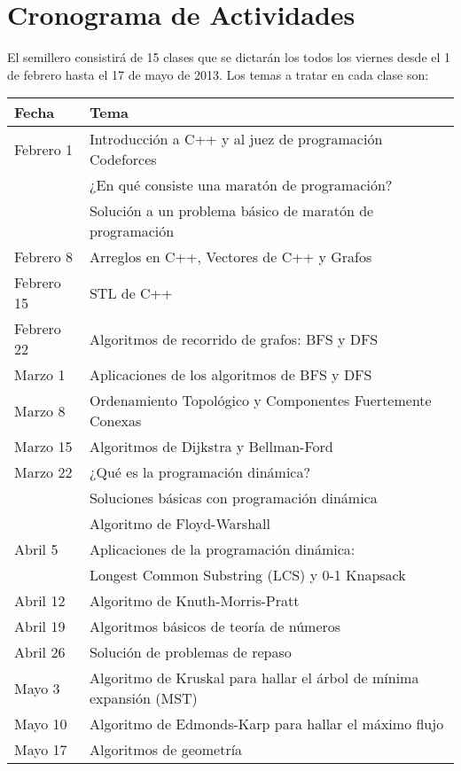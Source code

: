 \documentclass[11pt, oneside]{article}
\theoremstyle{definition}
\theoremstyle{remark}
\begin{document}
\section{Cronograma de Actividades}
El semillero consistirá de 15 clases que se dictarán los todos los viernes desde el 1 de febrero hasta el 17 de mayo de 2013. Los temas a tratar en cada clase son: \\ 

\begin{longtable}{|l|l|}
	\hline
	\textbf{Fecha} & \textbf{Tema} \\
	\hline \hline
	Febrero 1 & Introducción a C++ y al juez de programación Codeforces \cite{Codeforces}\\
	          & ¿En qué consiste una maratón de programación?\\
			  & Solución a un problema básico de maratón de programación  \qquad \qquad \qquad \qquad\\
	\hline
	Febrero 8 & Arreglos en C++, Vectores de C++ y Grafos\\
	\hline
	Febrero 15 & STL de C++\\
	\hline
	Febrero 22 & Algoritmos de recorrido de grafos: BFS y DFS\\
	\hline
	Marzo 1 & Aplicaciones de los algoritmos de BFS y DFS\\
	\hline
	Marzo 8 & Ordenamiento Topológico y Componentes Fuertemente Conexas\\
	\hline
	Marzo 15 & Algoritmos de Dijkstra y Bellman-Ford\\
	\hline
	Marzo 22 & ¿Qué es la programación dinámica?\\
	         & Soluciones básicas con programación dinámica\\
	         & Algoritmo de Floyd-Warshall\\
	\hline
	Abril 5 & Aplicaciones de la programación dinámica:\\
	        & Longest Common Substring (LCS) y 0-1 Knapsack\\
	\hline
	Abril 12 & Algoritmo de Knuth-Morris-Pratt\\
	\hline
	Abril 19 & Algoritmos básicos de teoría de números\\
	\hline
	Abril 26 & Solución de problemas de repaso\\
	\hline
	Mayo 3 & Algoritmo de Kruskal para hallar el árbol de mínima expansión (MST)\\
	\hline
	Mayo 10 & Algoritmo de Edmonds-Karp para hallar el máximo flujo\\
	\hline
	Mayo 17 & Algoritmos de geometría\\
	\hline
\end{longtable}
\end{document}
